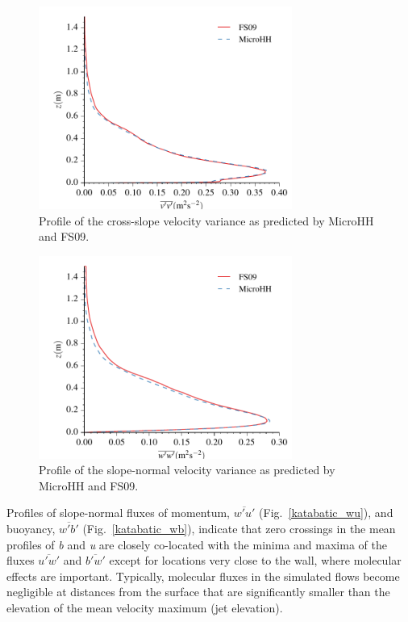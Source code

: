 \documentclass[gmd]{copernicus}
\begin{document}
\begin{figure}
\centerline{\includegraphics[width=8.3cm]{figs/katabatic_vv.pdf}}
\caption{Profile of the cross-slope velocity variance as predicted by MicroHH and FS09.}
\label{katabatic_vv}
\end{figure}

\begin{figure}
\centerline{\includegraphics[width=8.3cm]{figs/katabatic_ww.pdf}}
\caption{Profile of the slope-normal velocity variance as predicted by MicroHH and FS09.}
\label{katabatic_ww}
\end{figure}

Profiles of slope-normal fluxes of momentum, $\overline{w'u'}$ (Fig.~\ref{katabatic_wu}), and buoyancy, $\overline{w'b'}$ (Fig.~\ref{katabatic_wb}), indicate that zero crossings in the mean profiles of \textit{b} and \textit{u} are closely co-located with the minima and maxima of the fluxes $\overline{u'w'}$ and $\overline{b'w'}$ except for locations very close to the wall, where molecular effects are important. Typically, molecular fluxes in the simulated flows become negligible at distances from the surface that are significantly smaller than the elevation of the mean velocity maximum (jet elevation).
\end{document}

